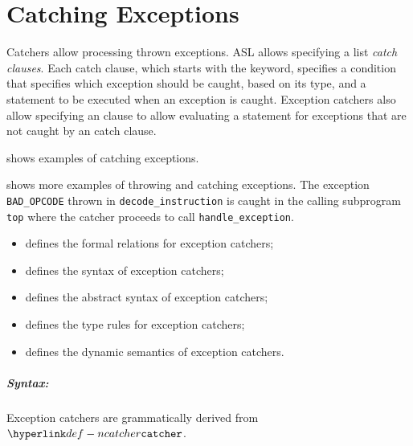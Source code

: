 \chapter{Catching Exceptions\label{chap:CatchingExceptions}}

Catchers allow processing thrown exceptions.
ASL allows specifying a list \emph{catch clauses}.
Each catch clause, which starts with the \Twhen{} keyword,
specifies a condition that specifies which exception
should be caught, based on its type, and a statement to be executed
when an exception is caught.
Exception catchers also allow specifying an \Totherwise{} clause
to allow evaluating a statement for exceptions that are not caught
by an catch clause.

 shows examples of catching exceptions.

 shows more examples of throwing and catching exceptions.
The exception \verb|BAD_OPCODE| thrown in \verb|decode_instruction| is caught in the calling
subprogram \verb|top| where the catcher proceeds to call \verb|handle_exception|.

\ChapterOutline
\begin{itemize}
  \item {} defines the formal relations for exception catchers;
  \item {} defines the syntax of exception catchers;
  \item {} defines the abstract syntax of exception catchers;
  \item {} defines the type rules for exception catchers;
  \item {} defines the dynamic semantics of exception catchers.
\end{itemize}

\paragraph{Syntax:} Exception catchers are grammatically derived from $\Ncatcher$.
